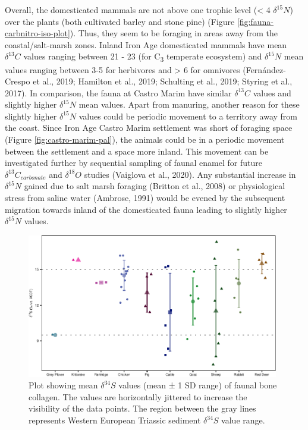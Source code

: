 \documentclass[review]{elsarticle} %
\begin{document}
Overall, the domesticated mammals are not above one trophic level (\textless{} 4\text{\textperthousand} \(\delta^{15}N\)) over the plants (both cultivated barley and stone pine) (Figure \ref{fig:fauna-carbnitro-iso-plot}). Thus, they seem to be foraging in areas away from the coastal/salt-marsh zones. Inland Iron Age domesticated mammals have mean \(\delta ^{13}C\) values ranging between 21 - 23\text{\textperthousand} (for C\textsubscript{3} temperate ecosystem) and \(\delta ^{15}N\) mean values ranging between 3-5\text{\textperthousand} for herbivores and \textgreater{} 6\text{\textperthousand} for omnivores (Fernández-Crespo et al., 2019; Hamilton et al., 2019; Schulting et al., 2019; Styring et al., 2017). In comparison, the fauna at Castro Marim have similar \(\delta ^{13}C\) values and slightly higher \(\delta ^{15}N\) mean values.
Apart from manuring, another reason for these slightly higher \(\delta^{15}N\) values could be periodic movement to a territory away from the coast. Since Iron Age Castro Marim settlement was short of foraging space (Figure \ref{fig:castro-marim-pal}), the animals could be in a periodic movement between the settlement and a space more inland. This movement can be investigated further by sequential sampling of faunal enamel for future \(\delta^{13}C_{carbonate}\) and \(\delta^{18}O\) studies (Vaiglova et al., 2020). Any substantial increase in \(\delta^{15}N\) gained due to salt marsh foraging (Britton et al., 2008) or physiological stress from saline water (Ambrose, 1991) would be evened by the subsequent migration towards inland of the domesticated fauna leading to slightly higher \(\delta ^{15}N\) values.



\begin{figure}
\includegraphics[width=0.98\textwidth]{castro_main_body_files/figure-latex/fauna-sulph-iso-plot-1} \caption{Plot showing mean \(\delta ^{34}S\) values (mean ± 1 SD range) of faunal bone collagen. The values are horizontally jittered to increase the visibility of the data points. The region between the gray lines represents Western European Triassic sediment \(\delta ^{34}S\) value range.}\label{fig:fauna-sulph-iso-plot}
\end{figure}
\end{document}
